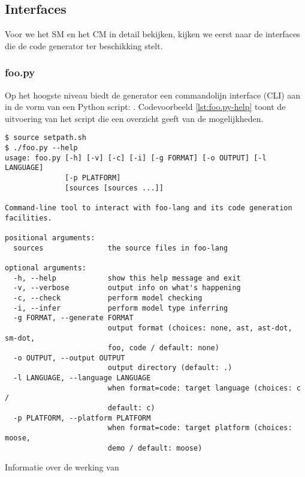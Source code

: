 
\subsection{Interfaces}
\label{subsection:devel-codegen-interfaces}

Voor we het SM en het CM in detail bekijken, kijken we eerst naar de interfaces
die de code generator ter beschikking stelt.

\subsubsection{foo.py}

Op het hoogste niveau biedt de generator een commandolijn interface (CLI) aan
in de vorm van een Python script: . Codevoorbeeld \ref{lst:foo.py-help}
toont de uitvoering van het script die een overzicht geeft van de mogelijkheden.

\begin{listing}[ht]
  \begin{verbatim}
$ source setpath.sh
$ ./foo.py --help
usage: foo.py [-h] [-v] [-c] [-i] [-g FORMAT] [-o OUTPUT] [-l LANGUAGE]
              [-p PLATFORM]
              [sources [sources ...]]

Command-line tool to interact with foo-lang and its code generation
facilities.

positional arguments:
  sources               the source files in foo-lang

optional arguments:
  -h, --help            show this help message and exit
  -v, --verbose         output info on what's happening
  -c, --check           perform model checking
  -i, --infer           perform model type inferring
  -g FORMAT, --generate FORMAT
                        output format (choices: none, ast, ast-dot, sm-dot,
                        foo, code / default: none)
  -o OUTPUT, --output OUTPUT
                        output directory (default: .)
  -l LANGUAGE, --language LANGUAGE
                        when format=code: target language (choices: c /
                        default: c)
  -p PLATFORM, --platform PLATFORM
                        when format=code: target platform (choices: moose,
                        demo / default: moose)
  \end{verbatim}
  \vspace{-5mm}
  \caption{Informatie over de werking van }
  \label{lst:foo.py-help}
\end{listing}

